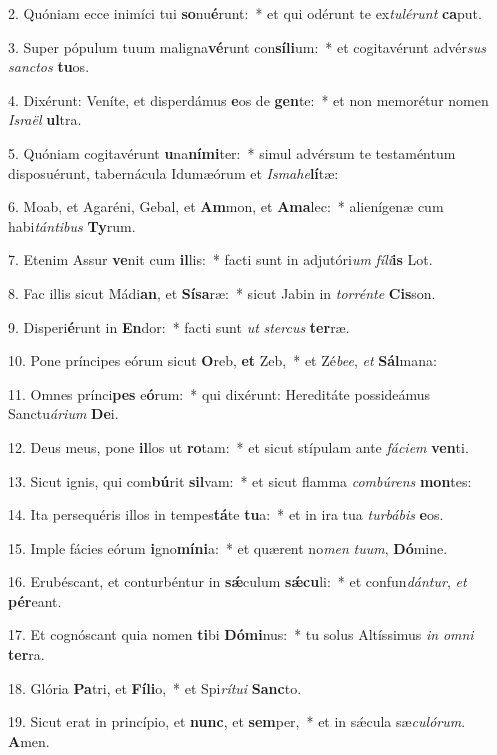 2. Quóniam ecce inimíci tui \textbf{so}nu\textbf{é}runt:~*  et qui odérunt te ex\textit{tu}\textit{lé}\textit{runt} \textbf{ca}put.\

3. Super pópulum tuum maligna\textbf{vé}runt con\textbf{sí}\textbf{li}um:~*  et cogitavérunt advér\textit{sus} \textit{sanc}\textit{tos} \textbf{tu}os.\

4. Dixérunt: Veníte, et disperdámus \textbf{e}os de \textbf{gen}te:~*  et non memorétur nomen \textit{Is}\textit{ra}\textit{ël} \textbf{ul}tra.\

5. Quóniam cogitavérunt \textbf{u}na\textbf{ní}\textbf{mi}ter:~*  simul advérsum te testaméntum disposuérunt, tabernácula Idumæórum et \textit{Is}\textit{ma}\textit{he}\textbf{lí}tæ:\

6. Moab, et Agaréni, Gebal, et \textbf{Am}mon, et \textbf{A}\textbf{ma}lec:~*  alienígenæ cum habi\textit{tán}\textit{ti}\textit{bus} \textbf{Ty}rum.\

7. Etenim Assur \textbf{ve}nit cum \textbf{il}lis:~*  facti sunt in adjutóri\textit{um} \textit{fí}\textit{li}\textbf{is} Lot.\

8. Fac illis sicut Mádi\textbf{an}, et \textbf{Sí}\textbf{sa}ræ:~*  sicut Jabin in \textit{tor}\textit{rén}\textit{te} \textbf{Cis}son.\

9. Disperi\textbf{é}runt in \textbf{En}dor:~*  facti sunt \textit{ut} \textit{ster}\textit{cus} \textbf{ter}ræ.\

10. Pone príncipes eórum sicut \textbf{O}reb, \textbf{et} Zeb,~*  et Zé\textit{be}\textit{e}, \textit{et} \textbf{Sál}mana:\

11. Omnes prínci\textbf{pes} e\textbf{ó}rum:~*  qui dixérunt: Hereditáte possideámus Sanctu\textit{á}\textit{ri}\textit{um} \textbf{De}i.\

12. Deus meus, pone \textbf{il}los ut \textbf{ro}tam:~*  et sicut stípulam ante \textit{fá}\textit{ci}\textit{em} \textbf{ven}ti.\

13. Sicut ignis, qui com\textbf{bú}rit \textbf{sil}vam:~*  et sicut flamma \textit{com}\textit{bú}\textit{rens} \textbf{mon}tes:\

14. Ita persequéris illos in tempes\textbf{tá}te \textbf{tu}a:~*  et in ira tua \textit{tur}\textit{bá}\textit{bis} \textbf{e}os.\

15. Imple fácies eórum \textbf{i}gno\textbf{mí}\textbf{ni}a:~*  et quærent no\textit{men} \textit{tu}\textit{um}, \textbf{Dó}mine.\

16. Erubéscant, et conturbéntur in \textbf{sǽ}culum \textbf{sǽ}\textbf{cu}li:~*  et confun\textit{dán}\textit{tur}, \textit{et} \textbf{pér}eant.\

17. Et cognóscant quia nomen \textbf{ti}bi \textbf{Dó}\textbf{mi}nus:~*  tu solus Altíssimus \textit{in} \textit{om}\textit{ni} \textbf{ter}ra.\

18. Glória \textbf{Pa}tri, et \textbf{Fí}\textbf{li}o,~*  et Spi\textit{rí}\textit{tu}\textit{i} \textbf{Sanc}to.\

19. Sicut erat in princípio, et \textbf{nunc}, et \textbf{sem}per,~*  et in sǽcula sæ\textit{cu}\textit{ló}\textit{rum}. \textbf{A}men.\

